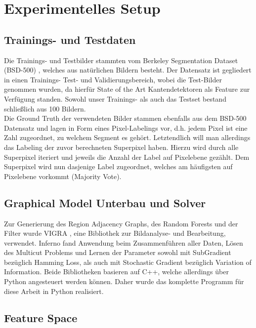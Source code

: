\chapter{Experimentelles Setup}\label{ch:mathtest} %

\section{Trainings- und Testdaten}


Die Trainings- und Testbilder stammten vom Berkeley Segmentation Dataset (BSD-500) \cite{BSD}, welches aus natürlichen Bildern besteht. Der Datensatz ist gegliedert in einen Trainings- Test- und Validierungsbereich, wobei die Test-Bilder genommen wurden, da hierfür State of the Art Kantendetektoren als Feature zur Verfügung standen. Sowohl unser Trainings- als auch das Testset bestand schließlich aus 100 Bildern. \\

Die Ground Truth der verwendeten Bilder stammen ebenfalls aus dem BSD-500 Datensatz und lagen in Form eines Pixel-Labelings vor, d.h. jedem Pixel ist eine Zahl zugeordnet, zu welchem Segment es gehört. Letztendlich will man allerdings das Labeling der zuvor berechneten Superpixel haben. Hierzu wird durch alle Superpixel iteriert und jeweils die Anzahl der Label auf Pixelebene gezählt. Dem Superpixel wird nun dasjenige Label zugeordnet, welches am häufigsten auf Pixelebene vorkommt (Majority Vote).


\section{Graphical Model Unterbau und Solver}


Zur Generierung des Region Adjacency Graphs, des Random Forests und der Filter wurde VIGRA \cite{VIGRA}, eine Bibliothek zur Bildanalyse- und Bearbeitung, verwendet. Inferno \cite{Inferno} fand Anwendung beim Zusammenführen aller Daten, Lösen des Multicut Problems und Lernen der Parameter sowohl mit SubGradient bezüglich Hamming Loss, als auch mit Stochastic Gradient bezüglich Variation of Information. Beide Bibliotheken basieren auf C++, welche allerdings über Python angesteuert werden können. Daher wurde das komplette Programm für diese Arbeit in Python realisiert.



\section{Feature Space}\label{sec:exp_featureSpace}

